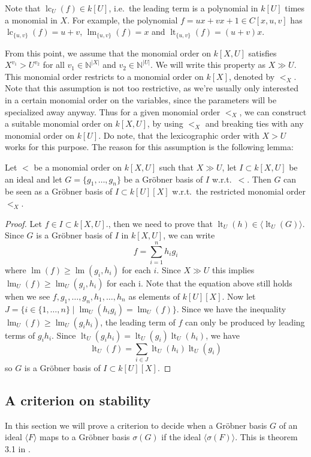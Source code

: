 \documentclass[a4paper, 12pt]{article}
\newcommand{\N}{\mathbb{N}}
\DeclareMathOperator{\LT}{lt}
\DeclareMathOperator{\LM}{lm}
\DeclareMathOperator{\LC}{lc}
\theoremstyle{changedot}
\theoremstyle{changedotbreak}
\theoremstyle{nonumberplain}
\newtheorem{proof}{Proof}
\begin{document}
Note that $\LC_{U}(f) \in k[U]$, i.e.\ the leading term is a polynomial in $k[U]$ times a monomial in $X$. For example, the polynomial $f = ux + vx + 1 \in C[x, u, v]$ has $\LC_{\{u, v\}}(f) = u + v$, $\LM_{\{u, v\}}(f) = x$ and $\LT_{\{u, v\}}(f) = (u+v)x$.

From this point, we assume that the monomial order on $k[X, U]$ satisfies $X^{v_{1}} > U^{v_{2}}$ for all $v_{1} \in \N^{|X|}$ and $v_{2} \in \N^{|U|}$. We will write this property as $X \gg U$. This monomial order restricts to a monomial order on $k[X]$, denoted by $<_{X}$. Note that this assumption is not too restrictive, as we're usually only interested in a certain monomial order on the variables, since the parameters will be specialized away anyway. Thus for a given monomial order $<_{X}$, we can construct a suitable monomial order on $k[X, U]$, by using $<_{X}$ and breaking ties with any monomial order on $k[U]$. Do note, that the lexicographic order with $X > U$ works for this purpose. The reason for this assumption is the following lemma:

\begin{lemma}\label{lem:block_order}
  Let $<$ be a monomial order on $k[X, U]$ such that $X \gg U$, let $I \subset k[X, U]$ be an ideal and let $G = \{g_{1}, \dots, g_{n}\}$ be a Gröbner basis of $I$ w.r.t.\ $<$. Then $G$ can be seen as a Gröbner basis of $I \subset k[U][X]$ w.r.t.\ the restricted monomial order $<_{X}$.
\end{lemma}
\begin{proof}
  Let $f \in I \subset k[X, U]$., then we need to prove that $\LT_{U}(h) \in \langle \LT_{U}(G) \rangle$. Since $G$ is a Gröbner basis of $I$ in $k[X, U]$, we can write
  \[ f = \sum_{i=1}^{n} h_{i} g_{i} \]
  where $\LM(f) \geq \LM(g_{i}, h_{i})$ for each $i$. Since $X \gg U$ this implies $\LM_{U}(f) \geq \LM_{U}(g_{i}, h_{i})$ for each i. Note that the equation above still holds when we see $f, g_{1}, \dots, g_{n}, h_{1}, \dots, h_{n}$ as elements of $k[U][X]$. Now let $J = \{i \in \{1, \dots, n\} \mid \LM_{U}(h_{i} g_{i}) = \LM_{U}(f)\}$. Since we have the inequality $\LM_{U}(f) \geq \LM_{U}(g_{i} h_{i})$, the leading term of $f$ can only be produced by leading terms of $g_{i}h_{i}$. Since $\LT_{U}(g_{i} h_{i}) = \LT_{U}(g_{i})\LT_{U}(h_{i})$, we have
  \[\LT_{U}(f) = \sum_{i \in J} \LT_{U}(h_{i}) \LT_{U}(g_{i})\]
  so $G$ is a Gröbner basis of $I \subset k[U][X]$.
\end{proof}


\subsection{A criterion on stability}
In this section we will prove a criterion to decide when a Gröbner basis $G$ of an ideal $\langle F \rangle$ maps to a Gröbner basis $\sigma(G)$ if the ideal $\langle \sigma(F) \rangle$. This is theorem 3.1 in \cite{Kalkbrener}.
\end{document}
